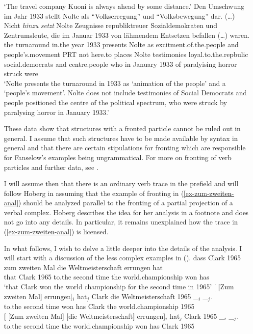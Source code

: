 \glt `The travel company Kuoni is always ahead by some distance.'
\ex  
\gll Den Umschwung im Jahr 1933 stellt Nolte als "`Volkserregung"' und "`Volksbewegung"' dar. (\ldots) Nicht \emph{hinzu} \emph{setzt} Nolte Zeugnisse republiktreuer Sozialdemokraten  und Zentrumsleute, die im Januar 1933 von lähmendem Entsetzen befallen (\ldots) waren.\footnotemark\\
	 the turnaround in.the year 1933 presents Nolte as excitment.of.the.people and people's.movement PRT {} not here.to places Nolte testimonies loyal.to.the.repbulic social.democrats and centre.people who in January 1933 of paralyising horror struck {} were\\
\label{ex-nicht-hinzu-setzt}
\glt `Nolte presents the turnaround in 1933 as `animation of the people' and a `people's movement'. Nolte does not include testimonies of Social Democrats and people positioned the centre of the political spectrum, who were struck by paralysing horror in January 1933.'
\zl



These data show that structures with a fronted particle cannot be ruled out in general. I assume that such structures have to be made
available by syntax in general and that there are certain stipulations for fronting which are responsible for Fanselow's examples
being ungrammatical. For more on fronting of verb particles and further data, see .

I will assume then that there is an ordinary verb trace in the prefield and will follow Hoberg in assuming that the example of fronting in (\ref{ex-zum-zweiten-anal})
should be analyzed parallel to the fronting of a partial projection of a verbal complex. Hoberg describes the idea for her analysis in a footnote and does
not go into any details. In particular, it remains unexplained how the trace in (\ref{ex-zum-zweiten-anal}) is licensed.

In what follows, I wish to delve a little deeper into the details of the analysis. I will start with a discussion of the less complex examples in ().
\eal
\ex\label{dass-clark} 
\gll dass Clark 1965 zum zweiten Mal die Weltmeisterschaft errungen hat\\
	 that Clark 1965 to.the second time the world.championship won has\\
\glt `that Clark won the world championship for the second time in 1965'
\ex\label{zum-zweiten-mal-hat} 
\gll {}[ [Zum zweiten Mal] errungen]$_i$  hat$_j$ Clark die Weltmeisterschaft 1965 \_$_i$ \_$_j$.\\
     {}          \spacebr{}to.the second time   won has Clark the world.championship 1965\\
\ex\label{zum-zweiten-mal-errungen} 
\gll {}[ [Zum zweiten Mal] [die Weltmeisterschaft] errungen]$_i$ hat$_j$ Clark 1965 \_$_i$ \_$_j$.\\
     {}          \spacebr{}to.the second time \spacebr{}the world.championship  won has Clark  1965\\
\zl



